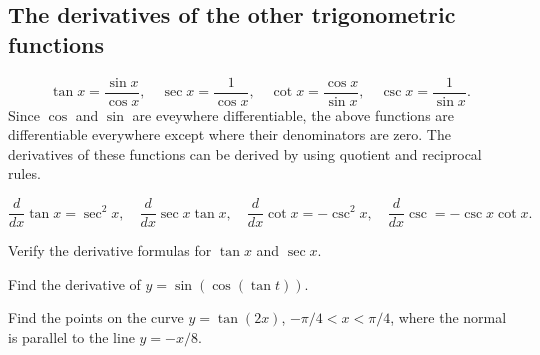 \documentclass[../calc1-main.tex]{subfiles}
\begin{document}
  \subsection*{The derivatives of the other trigonometric functions}
  \[
    \tan x = \frac{\sin x}{\cos x}, \quad
    \sec x = \frac{1}{\cos x}, \quad
    \cot x = \frac{\cos x}{\sin x}, \quad
     \csc x = \frac{1}{\sin x}.
  \]
  Since $\cos$ and $\sin$ are eveywhere differentiable, the above functions are differentiable everywhere except where their denominators are zero. The derivatives of these functions can be derived by using quotient and reciprocal rules.

  \[
    \frac{d}{dx} \tan x= \sec^2 x, \quad
    \frac{d}{dx} \sec x \tan x, \quad
    \frac{d}{dx} \cot x = -\csc^2 x, \quad
    \frac{d}{dx} \csc = -\csc x \cot x.
  \]

  \begin{example}
    Verify the derivative formulas for $\tan x$ and $\sec x$.
  \end{example}
  \begin{example}
    Find the derivative of $y = \sin(\cos(\tan t))$.
  \end{example}

  \begin{example}
    Find the points on the curve $y=\tan(2x)$, $-\pi/4 < x < \pi/4$, where the normal is parallel to the line $y=-x/8$.
  \end{example}
\end{document}
